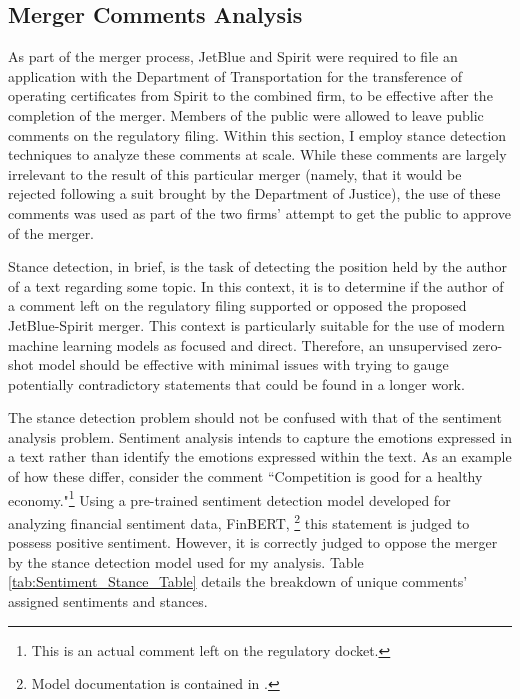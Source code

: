 \documentclass{article}
\begin{document}
\begin{appendices}
    \FloatBarrier
	\section{Merger Comments Analysis}
    \label{sec:NaturalLanguage}

    \setcounter{table}{0}
    \setcounter{figure}{0}


As part of the merger process, JetBlue and Spirit were required to file an application with the Department of Transportation for the transference of operating certificates from Spirit to the combined firm, to be effective after the completion of the merger. Members of the public were allowed to leave public comments on the regulatory filing. Within this section, I employ stance detection techniques to analyze these comments at scale. While these comments are largely irrelevant to the result of this particular merger (namely, that it would be rejected following a suit brought by the Department of Justice), the use of these comments was used as part of the two firms' attempt to get the public to approve of the merger.

Stance detection, in brief, is the task of detecting the position held by the author of a text regarding some topic. In this context, it is to determine if the author of a comment left on the regulatory filing supported or opposed the proposed JetBlue-Spirit merger. This context is particularly suitable for the use of modern machine learning models as focused and direct. Therefore, an unsupervised zero-shot model should be effective with minimal issues with trying to gauge potentially contradictory statements that could be found in a longer work. 

The stance detection problem should not be confused with that of the sentiment analysis problem. Sentiment analysis intends to capture the emotions expressed in a text rather than identify the emotions expressed within the text. As an example of how these differ, consider the comment ``Competition is good for a healthy economy."\footnote{This is an actual comment left on the regulatory docket.} Using a pre-trained sentiment detection model developed for analyzing financial sentiment data, FinBERT, \footnote{Model documentation is contained in \citet{araci_finbert_2019}.} this statement is judged to possess positive sentiment. However, it is correctly judged to oppose the merger by the stance detection model used for my analysis. Table \ref{tab:Sentiment_Stance_Table} details the breakdown of unique comments' assigned sentiments and stances. 


\end{appendices}
\end{document}
